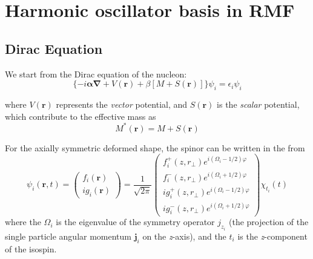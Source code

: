 \chapter{Harmonic oscillator basis in RMF}

\section{Dirac Equation}
We start from the Dirac equation of the nucleon:
\begin{equation}
    \{ -i\boldsymbol{\alpha \nabla } + V(\boldsymbol{r}) + \beta[M + S(\boldsymbol{r})] \} \psi_i = \epsilon_i \psi_i   \label{oc_dirac}
\end{equation}

where $V(\boldsymbol{r})$ represents the \textit{vector} potential, and $S(\boldsymbol{r})$ is the \textit{scalar} potential, which contribute to the effective mass as
\begin{equation}
    M^{*}(\boldsymbol{r}) = M + S(\boldsymbol{r})   \label{oc_effectiv_mass}
\end{equation}

For the axially symmetric deformed shape, the spinor can be written in the from
\begin{equation}
    \psi_{i}(\boldsymbol{r}, t)=\left(\begin{array}{c}
        f_{i}(\boldsymbol{r}) \\
        i g_{i}(\boldsymbol{r})
        \end{array}\right)=\frac{1}{\sqrt{2 \pi}}\left(\begin{array}{c}
        f_{i}^{+}\left(z, r_{\perp}\right) e^{i\left(\Omega_{i}-1 / 2\right) \varphi} \\
        f_{i}^{-}\left(z, r_{\perp}\right) e^{i\left(\Omega_{i}+1 / 2\right) \varphi} \\
        i g_{i}^{+}\left(z, r_{\perp}\right) e^{i\left(\Omega_{i}-1 / 2\right) \varphi} \\
        i g_{i}^{-}\left(z, r_{\perp}\right) e^{i\left(\Omega_{i}+1 / 2\right) \varphi}
    \end{array}\right) \chi_{t_{i}}(t)
\end{equation}
where the $\Omega_i$ is the eigenvalue of the symmetry operator $j_{z_i}$ (the projection of the single particle angular momentum $\bm{j}_i$ on the \textit{z}-axis), and the $t_i$ is the \textit{z}-component of the isospin.

